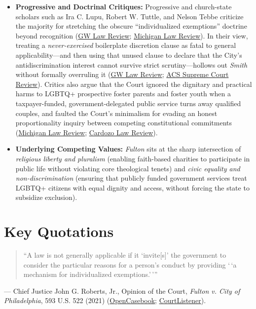 \documentclass[12pt]{article}
\begin{document}
\begin{itemize}
    \item \textbf{Progressive and Doctrinal Critiques:} Progressive and church-state scholars such as Ira C. Lupu, Robert W. Tuttle, and Nelson Tebbe criticize the majority for stretching the obscure ``individualized exemptions'' doctrine beyond recognition (\href{https://www.gwlr.org/two-surprises-in-fulton-v-city-of-philadelphia/}{GW Law Review}; \href{https://michiganlawreview.org/journal/the-politics-of-proportionality/}{Michigan Law Review}). In their view, treating a \emph{never-exercised} boilerplate discretion clause as fatal to general applicability---and then using that unused clause to declare that the City's antidiscrimination interest cannot survive strict scrutiny---hollows out \textit{Smith} without formally overruling it (\href{https://www.gwlr.org/two-surprises-in-fulton-v-city-of-philadelphia/}{GW Law Review}; \href{https://www.acslaw.org/analysis/acs-journal/2020-2021-acs-supreme-court-review/the-radical-uncertainty-of-free-exercise-principles-a-comment-on-fulton-v-city-of-philadelphia/}{ACS Supreme Court Review}). Critics also argue that the Court ignored the dignitary and practical harms to LGBTQ+ prospective foster parents and foster youth when a taxpayer-funded, government-delegated public service turns away qualified couples, and faulted the Court's minimalism for evading an honest proportionality inquiry between competing constitutional commitments (\href{https://michiganlawreview.org/journal/the-politics-of-proportionality/}{Michigan Law Review}; \href{https://www.cardozolawreview.com/remembering-who-foster-care-is-for-public-accommodation-and-other-misconceptions-and-missed-opportunities-in-fulton-v-city-of-philadelphia/}{Cardozo Law Review}).
    \item \textbf{Underlying Competing Values:} \textit{Fulton} sits at the sharp intersection of \emph{religious liberty and pluralism} (enabling faith-based charities to participate in public life without violating core theological tenets) and \emph{civic equality and non-discrimination} (ensuring that publicly funded government services treat LGBTQ+ citizens with equal dignity and access, without forcing the state to subsidize exclusion).
\end{itemize}

\section{Key Quotations}

\begin{quote}
``A law is not generally applicable if it `invite[s]' the government to consider the particular reasons for a person's conduct by providing `\,`a mechanism for individualized exemptions.'\,'''
\end{quote}
\noindent --- Chief Justice John G. Roberts, Jr., Opinion of the Court, \textit{Fulton v. City of Philadelphia}, 593 U.S. 522 (2021) (\href{https://opencasebook.org/casebooks/4501-constitutional-law/resources/12.9-fulton-v-city-of-philadelphia-2020/}{OpenCasebook}; \href{https://www.courtlistener.com/opinion/4892570/fulton-v-philadelphia/}{CourtListener}).
\end{document}
